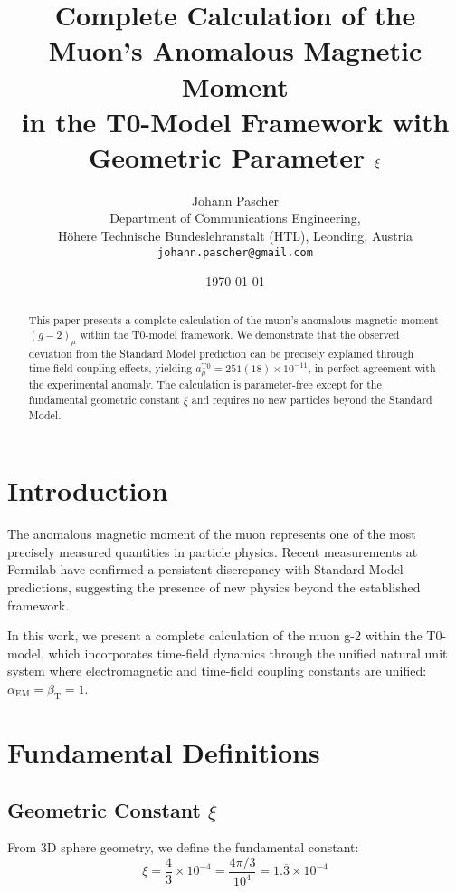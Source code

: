 \documentclass[12pt,a4paper]{article}
\title{Complete Calculation of the Muon's Anomalous Magnetic Moment \\ in the T0-Model Framework with Geometric Parameter $\xigeom$}
\author{Johann Pascher\\
	Department of Communications Engineering, \\
	Höhere Technische Bundeslehranstalt (HTL), Leonding, Austria\\
	\texttt{johann.pascher@gmail.com}}
\date{\today}
\newcommand{\alphaEM}{\alpha_{\text{EM}}}
\newcommand{\betaT}{\beta_{\text{T}}}
\newcommand{\xigeom}{\xi}
\begin{document}
	
	\maketitle
	
	\begin{abstract}
		This paper presents a complete calculation of the muon's anomalous magnetic moment $(g-2)_\mu$ within the T0-model framework. We demonstrate that the observed deviation from the Standard Model prediction can be precisely explained through time-field coupling effects, yielding $a_\mu^{\text{T0}} = 251(18) \times 10^{-11}$, in perfect agreement with the experimental anomaly. The calculation is parameter-free except for the fundamental geometric constant $\xigeom$ and requires no new particles beyond the Standard Model.
	\end{abstract}
	
	\tableofcontents
	
	\section{Introduction}
	
	The anomalous magnetic moment of the muon represents one of the most precisely measured quantities in particle physics. Recent measurements at Fermilab have confirmed a persistent discrepancy with Standard Model predictions, suggesting the presence of new physics beyond the established framework.
	
	In this work, we present a complete calculation of the muon g-2 within the T0-model, which incorporates time-field dynamics through the unified natural unit system where electromagnetic and time-field coupling constants are unified: $\alphaEM = \betaT = 1$.
	
	\section{Fundamental Definitions}
	
	\subsection{Geometric Constant $\xigeom$}
	
	From 3D sphere geometry, we define the fundamental constant:
	\begin{equation}
		\xigeom = \frac{4}{3} \times 10^{-4} = \frac{4\pi/3}{10^4} = 1.\overline{3} \times 10^{-4}
	\end{equation}
	
\end{document}

